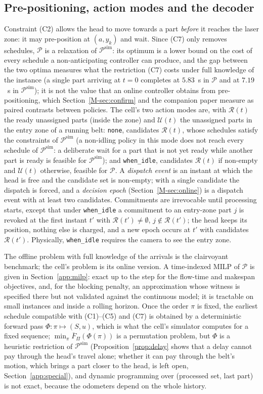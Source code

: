 \documentclass[11pt,a4paper]{article}
\theoremstyle{plain}
\theoremstyle{definition}
\theoremstyle{remark}
\newcommand{\Pb}{\mathcal{P}}
\newcommand{\Psim}{\Pb^{\mathrm{sim}}}
\newcommand{\Fpi}{\overline F_\Pi}
\begin{document}
\subsection{Pre-positioning, action modes and the decoder}
Constraint (C2) allows the head to move towards a part \emph{before} it reaches the laser
zone: it may pre-position at $(a,y_k)$ and wait. Since (C7) only removes schedules, $\Pb$ is a relaxation
of $\Psim$: its optimum is a lower bound on the cost of every schedule a non-anticipating
controller can produce, and the gap between the two optima measures what the restriction
(C7) costs under full knowledge of the instance (a single part arriving at $t=0$
completes at $5.83$~s in $\Pb$ and at $7.19$~s in $\Psim$); it is not the value that an online
controller obtains from pre-positioning, which Section~\ref{M-sec:confirm} and the companion
paper measure as paired contrasts between policies. The cell's two action modes
are, with $\mathcal R(t)$ the ready unassigned parts (inside the zone) and $\mathcal U(t)$
the unassigned parts in the entry zone of a running belt: \texttt{none}, candidates
$\mathcal R(t)$, whose schedules satisfy the constraints of $\Psim$ (a non-idling policy in
this mode does not reach every schedule of $\Psim$: a deliberate wait for a part that is
not yet ready while another part is ready is feasible for $\Psim$); and \texttt{when\_idle}, candidates $\mathcal R(t)$
if non-empty and $\mathcal U(t)$ otherwise, feasible for $\Pb$. A \emph{dispatch event} is an
instant at which the head is free and the candidate set is non-empty; with a single
candidate the dispatch is forced, and a \emph{decision epoch} (Section~\ref{M-sec:online})
is a dispatch event with at least two candidates. Commitments are
irrevocable until processing starts, except that under \texttt{when\_idle} a commitment to
an entry-zone part $j$ is revoked at the first instant $t'$ with $\mathcal R(t')\ne\emptyset$,
$j\notin\mathcal R(t')$; the head keeps its position, nothing else is charged, and a new
epoch occurs at $t'$ with candidates $\mathcal R(t')$. Physically, \texttt{when\_idle}
requires the camera to see the entry zone.

The offline problem with full knowledge of the arrivals is the clairvoyant benchmark; the
cell's problem is its online version. A time-indexed MILP of $\Pb$ is given
in Section~\ref{app:milp}: exact up to the step for the flow-time and makespan
objectives, and, for the blocking penalty, an approximation whose witness is specified
there but not validated against the continuous model; it is tractable on small instances
and inside a rolling horizon. Once the order $\pi$ is fixed,
the earliest schedule compatible with (C1)--(C5) and (C7) is obtained by a deterministic
forward pass $\Phi:\pi\mapsto(S,u)$, which is what the cell's simulator computes for a
fixed sequence; $\min_\pi\Fpi(\Phi(\pi))$ is a permutation problem, but $\Phi$ is a
heuristic restriction of $\Psim$ (Proposition~\ref{prop:delay} shows that a delay cannot
pay through the head's travel alone; whether it can pay through the belt's motion, which
brings a part closer to the head, is left open, Section~\ref{app:special}), and dynamic programming over (processed set, last part) is not
exact, because the odometers depend on the whole history.
\end{document}
